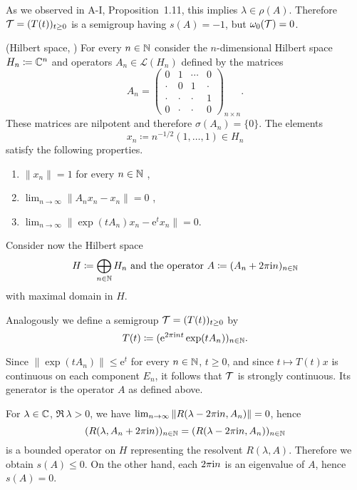 As we observed in A-I, Proposition~1.11, this implies $\lambda \in \rho(A)$.
Therefore $\mathcal{T} = (T(t))_{t\geq 0}$ is a semigroup having $s(A) = -1$, but $\omega_{0}(\mathcal{T}) = 0$.
\begin{example}\label{ex:a3-1.4}(Hilbert space, \citet{zabczyk:1975})
For every $n \in \mathbb{N}$ consider the $n$-dimensional Hilbert space $H_{n} \coloneqq \mathbb{C}^{n}$ and operators $A_{n} \in \mathcal{L}(H_{n})$ defined by the matrices
\[
    A_{n} =
    \begin{pmatrix}
    0 & 1 & \cdots & 0 \\
    \cdot & 0 & 1 & \cdot \\
    \cdot & \cdot & \cdot & 1 \\
    0 & \cdot & \cdot & 0
    \end{pmatrix}_{n \times n} .
\]
These matrices are nilpotent and therefore $\sigma(A_{n}) = \{0\}$.
The elements 
\[
	x_{n} \coloneqq n^{-1/2}(1, \ldots, 1) \in H_{n}
\]
satisfy the following properties.
\begin{enumerate}[\upshape (i)]
\item
	$\|x_{n}\| = 1$ for every $n \in \mathbb{N}$ , 

\item
	$\lim_{n \to \infty} \|A_{n}x_{n} - x_{n}\| = 0$ , 

\item
	$\lim_{n \to \infty} \|\exp(tA_{n})x_{n} - \mathrm{e}^{t}x_{n}\| = 0$. 

\end{enumerate}
Consider now the Hilbert space 
%
\[
	\text{$H \coloneqq \bigoplus_{n \in \mathbb{N}} H_{n}$ and the operator 
		$A \coloneqq (A_{n} + 2\pi\mathrm{i} n)_{n \in \mathbb{N}}$}
\]
%
with maximal domain in $H$.

Analogously we define a semigroup $\mathcal{T} = (T(t))_{t \geq 0}$ by
\[
    T(t) \coloneqq (\mathrm{e}^{2\pi\mathrm{i} nt}\exp(tA_{n}))_{n \in \mathbb{N}} .
\]
\end{example}
Since $\|\exp(tA_{n})\| \leq \mathrm{e}^{t}$ for every $n \in \mathbb{N}$, $t \geq 0$, and since $t \mapsto T(t)x$ is continuous on each component $E_{n}$, it follows that $\mathcal{T}$ is strongly continuous.
Its generator is the operator $A$ as defined above.

For $\lambda \in \mathbb{C}$, $\Re\,\lambda > 0$, we have 
$\lim_{n \to \infty} \|R(\lambda-2\pi\mathrm{i} n,A_{n})\| = 0$, hence
\[
    (R(\lambda,A_{n}+2\pi\mathrm{i} n))_{n \in \mathbb{N}} = (R(\lambda-2\pi\mathrm{i} n,A_{n}))_{n \in \mathbb{N}}
\]
is a bounded operator on $H$ representing the resolvent $R(\lambda,A)$.
Therefore we obtain $s(A) \leq 0$.
On the other hand, each $2\pi\mathrm{i} n$ is an eigenvalue of $A$, hence $s(A) = 0$.

